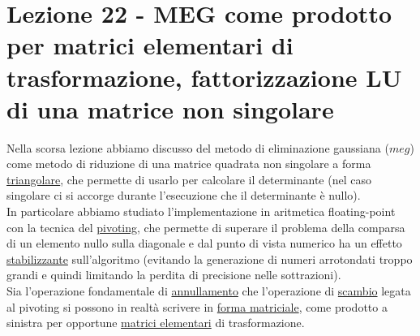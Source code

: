\documentclass[12pt,a4paper]{article}
\begin{document}
\section[Lezione 22 - Fattorizzazione LU]{Lezione 22 - MEG come prodotto per matrici elementari di trasformazione, fattorizzazione LU di una matrice non singolare}
Nella scorsa lezione abbiamo discusso del metodo di eliminazione gaussiana ($meg$) come metodo di riduzione di una matrice quadrata non singolare a forma \uline{triangolare}, che permette di usarlo per calcolare il determinante (nel caso singolare ci si accorge durante l'esecuzione che il determinante è nullo).\\In particolare abbiamo studiato l'implementazione in aritmetica floating-point con la tecnica del \uline{pivoting}, che permette di superare il problema della comparsa di un elemento nullo sulla diagonale e dal punto di vista numerico ha un effetto \uline{stabilizzante} sull'algoritmo (evitando la generazione di numeri arrotondati troppo grandi e quindi limitando la perdita di precisione nelle sottrazioni).\\
Sia l'operazione fondamentale di \uline{annullamento} che l'operazione di \uline{scambio} legata al pivoting si possono in realtà scrivere in \uline{forma matriciale}, come prodotto a sinistra per opportune \uline{matrici elementari} di trasformazione.
\end{document}
